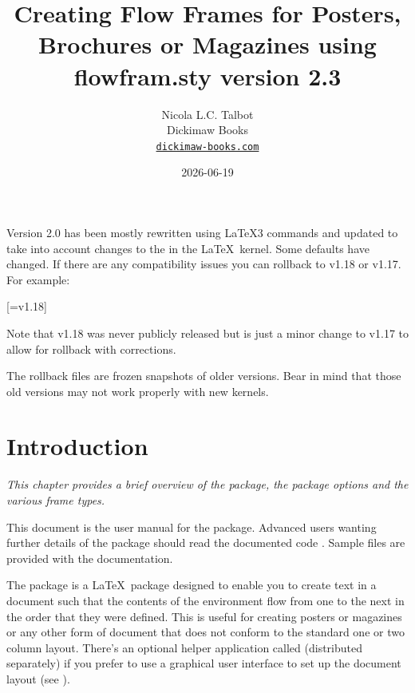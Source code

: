\documentclass[fontsize=12pt]{scrbook}
\title{Creating Flow Frames for Posters, Brochures or 
Magazines using flowfram.sty version 2.3}
\author{Nicola L.C. Talbot\\[10pt]
Dickimaw Books\\
\href{https://www.dickimaw-books.com/}{\nolinkurl{dickimaw-books.com}}}
\date{2026-06-19}
\newcommand\chapdesc[1]{\par\emph{#1}\par}
\newcommand{\chapdesc}[1]{%
   \appenddynamiccontents*{chaphead}{\par \normalfont\emph{#1}}%
  }
\begin{document}

\maketitle


\htmlavailable

\begin{information}
Version 2.0 has been mostly rewritten using \LaTeX3 commands and
updated to take into account changes to the  in the
\LaTeX\ kernel. Some defaults have changed. If there are any compatibility issues you can
rollback to v1.18 or v1.17. For example:
\begin{codebox}
[=v1.18]
\end{codebox}
Note that v1.18 was never publicly released but is just a minor
change to v1.17 to allow for rollback with corrections.

The rollback files are frozen snapshots of older versions.
Bear in mind that those old versions may not work properly with
new kernels.
\end{information}


\frontmatter

\tableofcontents
\listofexamples

\mainmatter
\enablethumbtabs
\chapter{Introduction}\label{sec:intro}
\chapdesc{This chapter provides a brief overview of the package, 
the package options and the various frame types.}

This document is the user manual for the  package.
Advanced users wanting further details of the package should read
the documented code . Sample files are provided
with the documentation. 

The  package is a \LaTeX\ package designed to 
enable you to create text  in a document such that 
the contents of the  environment flow from one 
 to the next in the order that they were defined.  
This is useful for creating posters
or magazines or any other form of document that does not 
conform to the standard one or two column layout. There's an
optional helper application called  (distributed
separately) if you prefer to use a graphical user interface to set up the
document layout (see ).
\end{document}
